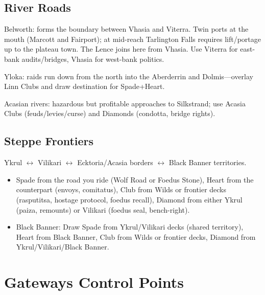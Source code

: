 \subsection{River Roads}
Belworth: forms the boundary between Vhasia and Viterra. Twin ports at the mouth (Marcott and Fairport); at mid-reach Tarlington Falls requires lift/portage up to the plateau town. The Lence joins here from Vhasia. Use Viterra for east-bank audits/bridges, Vhasia for west-bank politics.

Yloka: raids run down from the north into the Aberderrin and Dolmis---overlay Linn Clubs and draw destination for Spade+Heart.

Acasian rivers: hazardous but profitable approaches to Silkstrand; use Acasia Clubs (feuds/levies/curse) and Diamonds (condotta, bridge rights).

\subsection{Steppe Frontiers}
Ykrul $\leftrightarrow$ Vilikari $\leftrightarrow$ Ecktoria/Acasia borders $\leftrightarrow$ Black Banner territories.

\begin{itemize}
\item Spade from the road you ride (Wolf Road or Foedus Stone), Heart from the counterpart (envoys, comitatus), Club from Wilds or frontier decks (rasputitsa, hostage protocol, foedus recall), Diamond from either Ykrul (paiza, remounts) or Vilikari (foedus seal, bench-right).
\item Black Banner: Draw Spade from Ykrul/Vilikari decks (shared territory), Heart from Black Banner, Club from Wilds or frontier decks, Diamond from Ykrul/Vilikari/Black Banner.
\end{itemize}

\section{Gateways Control Points}

